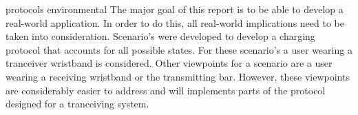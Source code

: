 protocols environmental
The major goal of this report is to be able to develop a real-world application. In order to do this,
all real-world implications need to be taken into consideration. Scenario's were developed to develop a charging protocol 
that accounts for all possible states. For these scenario's a user wearing a tranceiver wristband is considered. Other 
viewpoints for a scenario are a user wearing a receiving wristband or the transmitting bar. However, these viewpoints 
are considerably easier to address and will implements parts of the protocol designed for a tranceiving system. 
